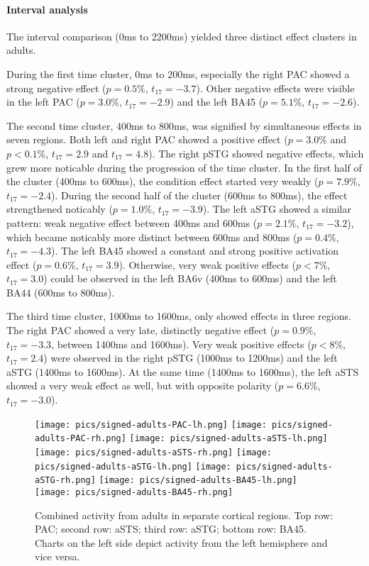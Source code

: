 \paragraph{Interval analysis}
The interval comparison (0ms to 2200ms) yielded three distinct effect clusters in adults.

During the first time cluster, 0ms to 200ms, especially the right PAC showed a strong negative effect ($p = 0.5\%$, $t_{17} = -3.7$).
Other negative effects were visible in the left PAC ($p = 3.0\%$, $t_{17} = -2.9$) and the left BA45 ($p = 5.1\%$, $t_{17} = -2.6$).

The second time cluster, 400ms to 800ms, was signified by simultaneous effects in seven regions.
Both left and right PAC showed a positive effect ($p = 3.0\%$ and $p < 0.1\%$, $t_{17} = 2.9$ and $t_{17} = 4.8$).
The right pSTG showed negative effects, which grew more noticable during the progression of the time cluster.
In the first half of the cluster (400ms to 600ms), the condition effect started very weakly ($p = 7.9\%$, $t_{17} = -2.4$).
During the second half of the cluster (600ms to 800ms), the effect strengthened noticably ($p = 1.0\%$, $t_{17} = -3.9$).
The left aSTG showed a similar pattern: weak negative effect between 400ms and 600ms ($p = 2.1\%$, $t_{17} = -3.2$), which became noticably more distinct between 600ms and 800ms ($p = 0.4\%$, $t_{17} = -4.3$).
The left BA45 showed a constant and strong positive activation effect ($p = 0.6\%$, $t_{17} = 3.9$).
Otherwise, very weak positive effects ($p < 7\%$, $t_{17} = 3.0$) could be observed in the left BA6v (400ms to 600ms) and the left BA44 (600ms to 800ms).

The third time cluster, 1000ms to 1600ms, only showed effects in three regions.
The right PAC showed a very late, distinctly negative effect ($p = 0.9\%$, $t_{17} = -3.3$, between 1400ms and 1600ms).
Very weak positive effects ($p < 8\%$, $t_{17} = 2.4$) were observed in the right pSTG (1000ms to 1200ms) and the left aSTG (1400ms to 1600ms).
At the same time (1400ms to 1600ms), the left aSTS showed a very weak effect as well, but with opposite polarity ($p = 6.6\%$, $t_{17} = -3.0$).

\begin{figure}[h]
\begin{center}
\texttt{[image: pics/signed-adults-PAC-lh.png]}
\texttt{[image: pics/signed-adults-PAC-rh.png]}
\texttt{[image: pics/signed-adults-aSTS-lh.png]}
\texttt{[image: pics/signed-adults-aSTS-rh.png]}
\texttt{[image: pics/signed-adults-aSTG-lh.png]}
\texttt{[image: pics/signed-adults-aSTG-rh.png]}
\texttt{[image: pics/signed-adults-BA45-lh.png]}
\texttt{[image: pics/signed-adults-BA45-rh.png]}
\caption{\label{4.3.activity.adults.ventral} Combined activity from adults in separate cortical regions. Top row: PAC; second row: aSTS; third row: aSTG; bottom row: BA45. Charts on the left side depict activity from the left hemisphere and vice versa.}
\end{center}
\end{figure}


